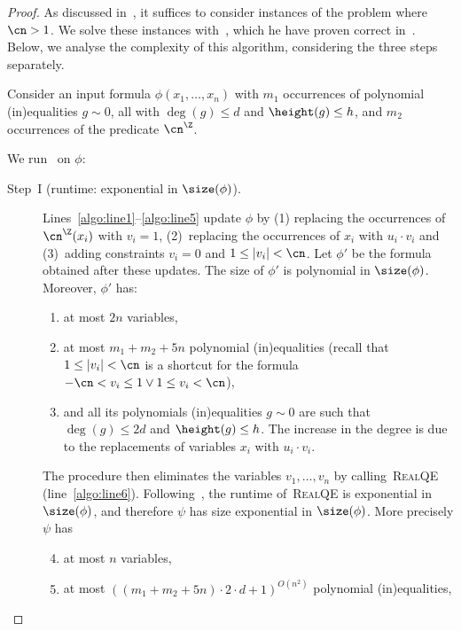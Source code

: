 \TheoremGeneralResultRootBarrier* 

\begin{proof}
  As discussed in~, it suffices to consider instances of 
  the problem where $\cn > 1$. We solve these instances with~, 
  which he have proven correct in~. 
  Below, we analyse the complexity of this algorithm, considering the three steps separately. 

  Consider an input formula $\phi(x_1,\dots,x_n)$ with $m_1$ occurrences of polynomial (in)equalities $g \sim 0$, all with $\deg(g) \leq d$ and $\height(g) \leq h$, and $m_2$ occurrences of the predicate $\ipow{\cn}$. 
  
  We run~ on $\phi$:
  \begin{description}
    \item[Step~I (runtime: exponential in $\size(\phi)$).] 
      Lines~\ref{algo:line1}--\ref{algo:line5} update $\phi$ by (1) replacing the occurrences of $\ipow{\cn}(x_i)$ with $v_i = 1$, (2)~replacing the occurrences of $x_i$ with $u_i \cdot v_i$ and (3)~adding constraints $v_i = 0$ and $1 \leq \abs{v_i} < \cn$. Let $\phi'$ be the formula obtained after these updates. The size of $\phi'$ is polynomial in $\size(\phi)$. Moreover, $\phi'$ has:
      \begin{enumerate}
        \item at most $2n$ variables,
        \item at most $m_1+m_2+5n$ polynomial (in)equalities (recall that $1 \leq \abs{v_i} < \cn$ is a shortcut for the formula $-\cn < v_i \leq 1 \lor 1 \leq v_i < \cn$),
        \item and all its polynomials (in)equalities $g \sim 0$ are such that $\deg(g) \leq 2d$ and $\height(g) \leq h$. The increase in the degree is due to the replacements of variables $x_i$ with $u_i \cdot v_i$.
      \end{enumerate}
      The procedure then eliminates the variables $v_1,\dots,v_n$ by
      calling~\textsc{RealQE} (line~\ref{algo:line6}).
      Following~, the runtime of~\textsc{RealQE} is exponential
      in $\size(\phi)$, and therefore $\psi$ has size exponential in
      $\size(\phi)$. More precisely $\psi$ has 
      \begin{enumerate}
        \setcounter{enumi}{3}
        \item at most $n$ variables,
        \item\label{rtalgo:it5} at most $((m_1+m_2+5n) \cdot 2 \cdot d + 1)^{O(n^2)}$ polynomial (in)equalities,

\end{enumerate}
\end{description}
\end{proof}
